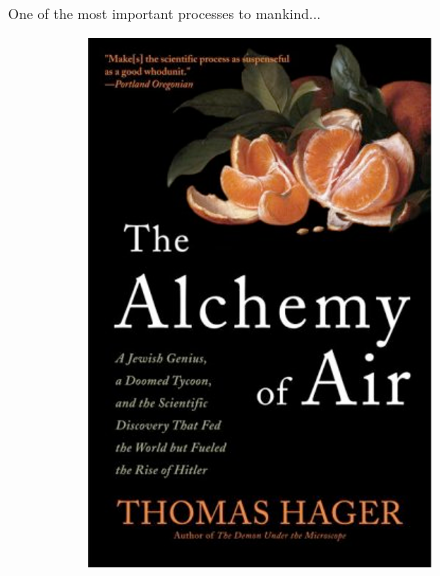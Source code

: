 \documentclass[aspectratio=169]{beamer}
\begin{document}
\begin{frame}{One of the most important processes to mankind...}
\begin{figure}
    \centering
    \begin{subfigure}{0.25\textwidth}
    \includegraphics[width=\linewidth]{lectures/figures/Lab1_Alchemy_of_Air.png}
    \end{subfigure}
    \begin{subfigure}{0.4\textwidth}

\end{subfigure}
\end{figure}
\end{frame}
\end{document}
